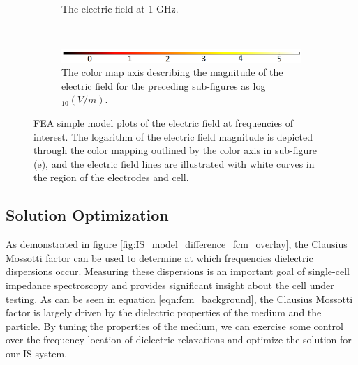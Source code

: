 \begin{figure}[h]
\begin{subfigure}[b]{\textwidth}
        \caption{The electric field at 1 GHz.}
    \end{subfigure}
        \\
    \vspace{0.1 in}
    \begin{subfigure}[b]{\textwidth}
        \centering
        \includegraphics[width=\textwidth]{images/simpleCellColorMapAxis.png}
        \caption{The color map axis describing the magnitude of the electric field for the preceding sub-figures as log$_{10}(V/m)$.}
    \end{subfigure}
    \caption[FEA simple model electric field surface plot.]{FEA simple model plots of the electric field at frequencies of interest. The logarithm of the electric field magnitude is depicted through the color mapping outlined by the color axis in sub-figure (e), and the electric field lines are illustrated with white curves in the region of the electrodes and cell.}
    \label{fig:single_cell_model_EZ_plots}
\end{figure}


\FloatBarrier

\subsection{Solution Optimization}
\label{sec:solution_optimization}

\par As demonstrated in figure \ref{fig:IS_model_difference_fcm_overlay}, the Clausius Mossotti factor can be used to determine at which frequencies dielectric dispersions occur. Measuring these dispersions is an important goal of single-cell impedance spectroscopy and provides significant insight about the cell under testing. As can be seen in equation \ref{eqn:fcm_background}, the Clausius Mossotti factor is largely driven by the dielectric properties of the medium and the particle. By tuning the properties of the medium, we can exercise some control over the frequency location of dielectric relaxations and optimize the solution for our IS system. 

